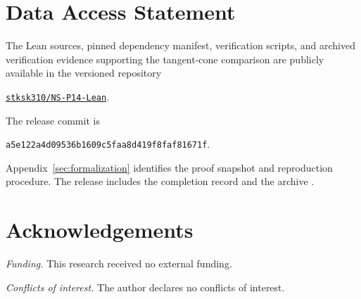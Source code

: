 \section*{Data Access Statement}
The Lean sources, pinned dependency manifest, verification scripts, and
archived verification evidence supporting the tangent-cone comparison
are publicly available in the versioned repository
\begin{center}
\href{https://github.com/stksk310/NS-P14-Lean/tree/a5e122a4d09536b1609c5faa8d419f8faf81671f}{\texttt{stksk310/NS-P14-Lean}}.
\end{center}
The release commit is
\begin{center}\small
\texttt{a5e122a4d09536b1609c5faa8d419f8faf81671f}.
\end{center}
Appendix~\ref{sec:formalization} identifies the proof snapshot and
reproduction procedure. The release includes the completion record and
the archive .

\section*{Acknowledgements}
\textit{Funding.} This research received no external funding.

\textit{Conflicts of interest.} The author declares no conflicts of interest.
